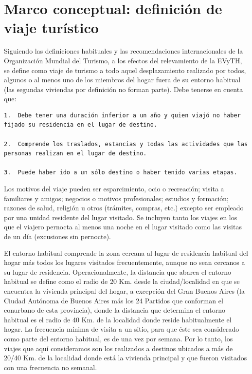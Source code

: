\documentclass[
  openany]{book}
\begin{document}
\hypertarget{marco-conceptual-definiciuxf3n-de-viaje-turuxedstico}{%
\section{Marco conceptual: definición de viaje turístico}\label{marco-conceptual-definiciuxf3n-de-viaje-turuxedstico}}

Siguiendo las definiciones habituales y las recomendaciones internacionales de la Organización Mundial del Turismo, a los efectos del relevamiento de la EVyTH, se define como viaje de turismo a todo aquel desplazamiento realizado por todos, algunos o al menos uno de los miembros del hogar fuera de su entorno habitual (las segundas viviendas por definición no forman parte). Debe tenerse en cuenta que:

\begin{verbatim}
1.  Debe tener una duración inferior a un año y quien viajó no haber fijado su residencia en el lugar de destino.

2.  Comprende los traslados, estancias y todas las actividades que las personas realizan en el lugar de destino.

3.  Puede haber ido a un sólo destino o haber tenido varias etapas.
\end{verbatim}

Los motivos del viaje pueden ser esparcimiento, ocio o recreación; visita a familiares y amigos; negocios o motivos profesionales; estudios y formación; razones de salud, religión u otros (trámites, compras, etc.) excepto ser empleado por una unidad residente del lugar visitado. Se incluyen tanto los viajes en los que el viajero pernocta al menos una noche en el lugar visitado como las visitas de un día (excusiones sin pernocte).

El entorno habitual comprende la zona cercana al lugar de residencia habitual del hogar más todos los lugares visitados frecuentemente, aunque no sean cercanos a su lugar de residencia. Operacionalmente, la distancia que abarca el entorno habitual se define como el radio de 20 Km. desde la ciudad/localidad en que se encuentra la vivienda principal del hogar, a excepción del Gran Buenos Aires (la Ciudad Autónoma de Buenos Aires más los 24 Partidos que conforman el conurbano de esta provincia), donde la distancia que determina el entorno habitual es el radio de 40 Km. de la localidad donde reside habitualmente el hogar. La frecuencia mínima de visita a un sitio, para que éste sea considerado como parte del entorno habitual, es de una vez por semana. Por lo tanto, los viajes que aquí consideramos son los realizados a destinos ubicados a más de 20/40 Km. de la localidad donde está la vivienda principal y que fueron visitados con una frecuencia no semanal.
\end{document}
